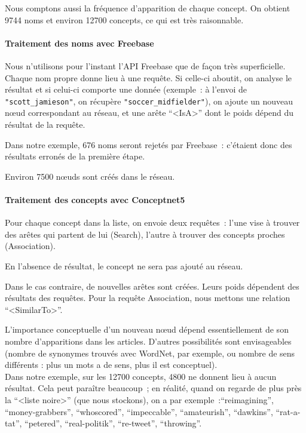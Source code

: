 \documentclass[a4paper, 12pt]{article}
\begin{document}
Nous comptons aussi la fréquence d'apparition de chaque concept. On obtient 9744 noms et environ 12700 concepts, ce qui est très raisonnable.

\paragraph{Traitement des noms avec Freebase}

Nous n'utilisons pour l'instant l'API Freebase que de fa\c{c}on très superficielle. Chaque nom propre donne lieu à une requête. Si celle-ci aboutit, on analyse le résultat et si celui-ci comporte une donnée (exemple~: à l'envoi de \verb|"scott_jamieson"|, on récupère \verb|"soccer_midfielder"|), on ajoute un nouveau nœud correspondant au réseau, et une arête ``<IsA>'' dont le poids dépend du résultat de la requête.

Dans notre exemple, 676 noms seront rejetés par Freebase~: c'étaient donc des résultats erronés de la première étape.

Environ 7500 nœuds sont créés dans le réseau.

\paragraph{Traitement des concepts avec Conceptnet5}

Pour chaque concept dans la liste, on envoie deux requêtes~: l'une vise à trouver des arêtes qui partent de lui (Search), l'autre à trouver des concepts proches (Association).

En l'absence de résultat, le concept ne sera pas ajouté au réseau.

Dans le cas contraire, de nouvelles arêtes sont créées. Leurs poids dépendent des résultats des requêtes. Pour la requête Association, nous mettons une relation ``<SimilarTo>''.

L'importance conceptuelle d'un nouveau nœud dépend essentiellement de son nombre d'apparitions dans les articles. D'autres possibilités sont envisageables (nombre de synonymes trouvés avec WordNet, par exemple, ou nombre de sens différents : plus un mots a de sens, plus il est conceptuel).\\

Dans notre exemple, sur les 12700 concepts, 4800 ne donnent lieu à aucun résultat. Cela peut paraître beaucoup~; en réalité, quand on regarde de plus près la ``<liste noire>'' (que nous stockons), on a par exemple~:``reimagining'', ``money-grabbers'', ``whoscored'', ``impeccable'', ``amateurish'', ``dawkins'', ``rat-a-tat'', ``petered'', ``real-politik'', ``re-tweet'', ``throwing''.
\end{document}
